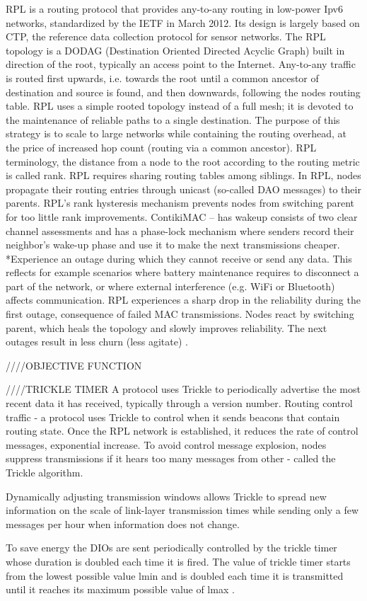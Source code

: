 RPL is a routing protocol that provides any-to-any routing in low-power Ipv6 networks, standardized by the IETF in March 2012. Its design is largely based on CTP, the reference data collection protocol for sensor networks. The RPL topology is a DODAG (Destination Oriented Directed Acyclic Graph) built in direction of the root, typically an access point to the Internet. Any-to-any traffic is routed first upwards, i.e. towards the root until a common ancestor of destination and source is found, and then downwards, following the nodes routing table. RPL uses a simple rooted topology instead of a full mesh; it is devoted to the maintenance of reliable paths to a single destination. The purpose of this strategy is to scale to large networks while containing the routing overhead, at the price of increased hop count (routing via a common ancestor). RPL terminology, the distance from a node to the root according to the routing metric is called rank. RPL requires sharing routing tables among siblings. In RPL, nodes propagate their routing entries through unicast (so-called DAO messages) to their parents. RPL’s rank hysteresis mechanism prevents nodes from switching parent for too little rank improvements. ContikiMAC – has wakeup consists of two clear channel assessments and has a phase-lock mechanism where senders record their neighbor’s wake-up phase and use it to make the next transmissions cheaper. *Experience an outage during which they cannot receive or send any data. This reflects for example scenarios where battery maintenance requires to disconnect a part of the network, or where external interference (e.g. WiFi or Bluetooth) affects communication. RPL experiences a sharp drop in the reliability during the first outage, consequence of failed MAC transmissions. Nodes react by switching parent, which heals the topology and slowly improves reliability. The next outages result in less churn (less agitate) \cite{orpl}.

////OBJECTIVE FUNCTION

////TRICKLE TIMER
A protocol uses Trickle to periodically advertise the most recent data it has received, typically through a version number. Routing control traffic - a protocol uses Trickle to control when it sends beacons that contain routing state.
Once the RPL network is established, it reduces the rate of control messages, exponential increase. To avoid control message explosion, nodes suppress transmissions if it hears too many messages from other - called the Trickle algorithm. 

Dynamically adjusting transmission windows allows Trickle to spread new information on the scale of link-layer transmission times while sending only a few messages per hour when information does not change.

To save energy the DIOs are sent periodically controlled by the trickle timer whose duration is doubled each time it is fired. The value of trickle timer starts from the lowest possible value lmin and is doubled each time it is transmitted until it reaches its maximum possible value of lmax \cite{trickle}.
